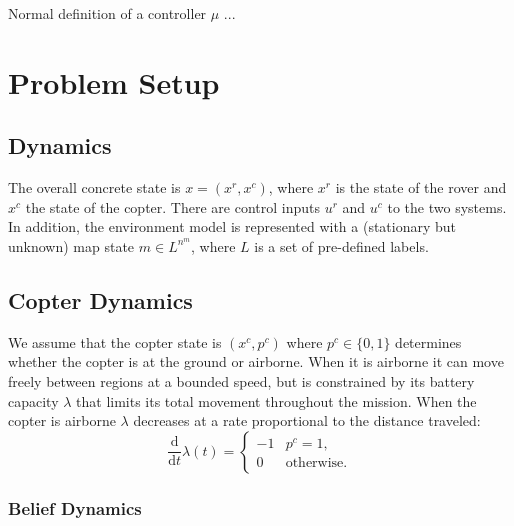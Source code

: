\documentclass[conference]{IEEEtran}
\begin{document}
Normal definition of a controller $\mu$ ...

\section{Problem Setup}

\subsection{Dynamics}

The overall concrete state is $x = (x^r, x^c)$, where $x^r$ is the state of the rover and $x^c$ the state of the copter. There are control inputs $u^r$ and $u^c$ to the two systems. In addition, the environment model is represented with a (stationary but unknown) map state $m \in L^{n^m}$, where $L$ is a set of pre-defined labels.

\subsection{Copter Dynamics}

We assume that the copter state is $(x^c, p^c)$ where $p^c \in \{ 0,1 \}$ determines whether the copter is at the ground or airborne. When it is airborne it can move freely between regions at a bounded speed, but is constrained by its battery capacity $\lambda$ that limits its total movement throughout the mission. When the copter is airborne $\lambda$ decreases at a rate proportional to the distance traveled:
\begin{equation}
  \frac{\mathrm{d}}{\mathrm{d}t} \lambda(t) = \begin{cases}
    -1 & p^c = 1, \\
    0 & \text{otherwise}.
  \end{cases}
\end{equation}

\subsubsection{Belief Dynamics}
\end{document}
